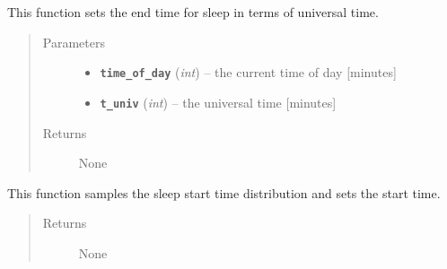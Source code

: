 \documentclass[letterpaper,10pt,english]{sphinxmanual}
\begin{document}
\begin{fulllineitems}
\begin{fulllineitems}
\begin{quote}
\begin{description}
\end{description}\end{quote}

\end{fulllineitems}


\begin{fulllineitems}
\label{bio:bio.Bio.update_sleep_end_univ}
This function sets the end time for sleep in terms of universal time.
\begin{quote}\begin{description}
\item[{Parameters}] \leavevmode\begin{itemize}
\item {} 
\textbf{\texttt{time\_of\_day}} (\emph{int}) -- the current time of day {[}minutes{]}

\item {} 
\textbf{\texttt{t\_univ}} (\emph{int}) -- the universal time {[}minutes{]}

\end{itemize}

\item[{Returns}] \leavevmode
None

\end{description}\end{quote}

\end{fulllineitems}


\begin{fulllineitems}
\label{bio:bio.Bio.update_sleep_start}
This function samples the sleep start time distribution and sets the start time.
\begin{quote}\begin{description}
\item[{Returns}] \leavevmode
None

\end{description}\end{quote}

\end{fulllineitems}



\end{fulllineitems}
\end{document}
